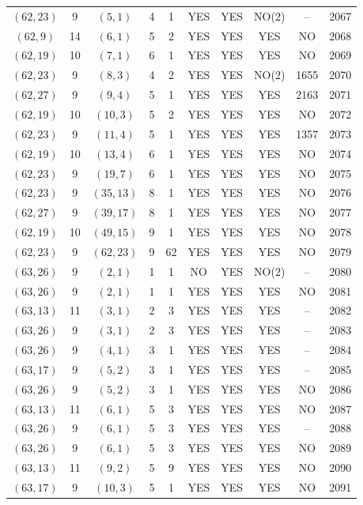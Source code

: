 \begin{longtable}{|c|c|c|c|c|c|c|c|c|c|}
$(62, 23)$ & 9 & $(5, 1)$ & 4 & 1 & YES & YES & NO(2) & -- & 2067\\
$(62, 9)$ & 14 & $(6, 1)$ & 5 & 2 & YES & YES & YES & NO & 2068\\
$(62, 19)$ & 10 & $(7, 1)$ & 6 & 1 & YES & YES & YES & NO & 2069\\
$(62, 23)$ & 9 & $(8, 3)$ & 4 & 2 & YES & YES & NO(2) & 1655 & 2070\\
$(62, 27)$ & 9 & $(9, 4)$ & 5 & 1 & YES & YES & YES & 2163 & 2071\\
$(62, 19)$ & 10 & $(10, 3)$ & 5 & 2 & YES & YES & YES & NO & 2072\\
$(62, 23)$ & 9 & $(11, 4)$ & 5 & 1 & YES & YES & YES & 1357 & 2073\\
$(62, 19)$ & 10 & $(13, 4)$ & 6 & 1 & YES & YES & YES & NO & 2074\\
$(62, 23)$ & 9 & $(19, 7)$ & 6 & 1 & YES & YES & YES & NO & 2075\\
$(62, 23)$ & 9 & $(35, 13)$ & 8 & 1 & YES & YES & YES & NO & 2076\\
$(62, 27)$ & 9 & $(39, 17)$ & 8 & 1 & YES & YES & YES & NO & 2077\\
$(62, 19)$ & 10 & $(49, 15)$ & 9 & 1 & YES & YES & YES & NO & 2078\\
$(62, 23)$ & 9 & $(62, 23)$ & 9 & 62 & YES & YES & YES & NO & 2079\\
$(63, 26)$ & 9 & $(2, 1)$ & 1 & 1 & NO & YES & NO(2) & -- & 2080\\
$(63, 26)$ & 9 & $(2, 1)$ & 1 & 1 & YES & YES & YES & NO & 2081\\
$(63, 13)$ & 11 & $(3, 1)$ & 2 & 3 & YES & YES & YES & -- & 2082\\
$(63, 26)$ & 9 & $(3, 1)$ & 2 & 3 & YES & YES & YES & -- & 2083\\
$(63, 26)$ & 9 & $(4, 1)$ & 3 & 1 & YES & YES & YES & -- & 2084\\
$(63, 17)$ & 9 & $(5, 2)$ & 3 & 1 & YES & YES & YES & -- & 2085\\
$(63, 26)$ & 9 & $(5, 2)$ & 3 & 1 & YES & YES & YES & NO & 2086\\
$(63, 13)$ & 11 & $(6, 1)$ & 5 & 3 & YES & YES & YES & NO & 2087\\
$(63, 26)$ & 9 & $(6, 1)$ & 5 & 3 & YES & YES & YES & -- & 2088\\
$(63, 26)$ & 9 & $(6, 1)$ & 5 & 3 & YES & YES & YES & NO & 2089\\
$(63, 13)$ & 11 & $(9, 2)$ & 5 & 9 & YES & YES & YES & NO & 2090\\
$(63, 17)$ & 9 & $(10, 3)$ & 5 & 1 & YES & YES & YES & NO & 2091\\

\end{longtable}
